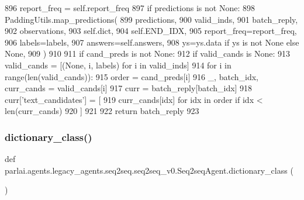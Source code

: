 \begin{DoxyCode}
896             report\_freq = self.report\_freq
897         \textcolor{keywordflow}{if} predictions \textcolor{keywordflow}{is} \textcolor{keywordflow}{not} \textcolor{keywordtype}{None}:
898             PaddingUtils.map\_predictions(
899                 predictions,
900                 valid\_inds,
901                 batch\_reply,
902                 observations,
903                 self.dict,
904                 self.END\_IDX,
905                 report\_freq=report\_freq,
906                 labels=labels,
907                 answers=self.answers,
908                 ys=ys.data \textcolor{keywordflow}{if} ys \textcolor{keywordflow}{is} \textcolor{keywordflow}{not} \textcolor{keywordtype}{None} \textcolor{keywordflow}{else} \textcolor{keywordtype}{None},
909             )
910 
911         \textcolor{keywordflow}{if} cand\_preds \textcolor{keywordflow}{is} \textcolor{keywordflow}{not} \textcolor{keywordtype}{None}:
912             \textcolor{keywordflow}{if} valid\_cands \textcolor{keywordflow}{is} \textcolor{keywordtype}{None}:
913                 valid\_cands = [(\textcolor{keywordtype}{None}, i, labels) \textcolor{keywordflow}{for} i \textcolor{keywordflow}{in} valid\_inds]
914             \textcolor{keywordflow}{for} i \textcolor{keywordflow}{in} range(len(valid\_cands)):
915                 order = cand\_preds[i]
916                 \_, batch\_idx, curr\_cands = valid\_cands[i]
917                 curr = batch\_reply[batch\_idx]
918                 curr[\textcolor{stringliteral}{'text\_candidates'}] = [
919                     curr\_cands[idx] \textcolor{keywordflow}{for} idx \textcolor{keywordflow}{in} order \textcolor{keywordflow}{if} idx < len(curr\_cands)
920                 ]
921 
922         \textcolor{keywordflow}{return} batch\_reply
923 
\end{DoxyCode}
\mbox{\label{classparlai_1_1agents_1_1legacy__agents_1_1seq2seq_1_1seq2seq__v0_1_1Seq2seqAgent_a05552a2714cd8d15d754a62258727c98}} 
\subsubsection{\texorpdfstring{dictionary\+\_\+class()}{dictionary\_class()}}
{\footnotesize\ttfamily def parlai.\+agents.\+legacy\+\_\+agents.\+seq2seq.\+seq2seq\+\_\+v0.\+Seq2seq\+Agent.\+dictionary\+\_\+class (\begin{DoxyParamCaption}{ }\end{DoxyParamCaption})\hspace{0.3cm}{\ttfamily [static]}}



